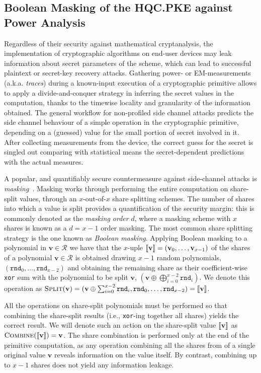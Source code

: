 \subsection{Boolean Masking of the HQC.PKE against Power Analysis}\label{subsec:masking}
Regardless of their security against mathematical cryptanalysis, the 
implementation of cryptographic algorithms on end-user devices may leak 
information about secret parameters of the scheme, which can lead to 
successful plaintext or secret-key recovery attacks. 
Gathering power- or EM-measurements (a.k.a. {\em traces}) during a known-input 
execution of a cryptographic primitive allows to apply a divide-and-conquer 
strategy in inferring the secret values in the computation, thanks to the 
timewise locality and granularity of the information obtained.
The general workflow for non-profiled side channel attacks predicts the side
channel behaviour of a simple operation in the cryptographic primitive, depending
on a (guessed) value for the small portion of secret involved in it.
After collecting measurements from the device, the correct guess for the secret
is singled out comparing with statistical means the secret-dependent predictions
with the actual measures.

A popular, and quantifiably secure countermeasure against side-channel attacks 
is \emph{masking}~\cite{ishai2003private,prouff2013masking}.
Masking works through performing the entire computation on share-split values, 
through an $x$-out-of-$x$ share splitting schemes.
The number of shares into which a value is split provides a quantification
of the security margin: this is commonly denoted as the \emph{masking order} $d$, 
where a masking scheme with $x$ shares is known as a $d=x-1$ order masking.
The most common share splitting strategy is the one known as 
\emph{Boolean masking}.
Applying Boolean masking to a polynomial in $\mathbf{v}\in\mathcal{R}$ we have that the $x$-uple $ \llbracket \mathbf{v} \rrbracket = (\mathbf{v}_0,\ldots,\mathbf{v}_{x-1})$ of the shares of a polynomial $\mathbf{v}\in \mathcal{R}$ is obtained drawing $x-1$ random polynomials, 
$(\mathtt{rnd}_0,\ldots,\mathtt{rnd}_{x-2})$ and obtaining the remaining share 
as their coefficient-wise \texttt{xor} sum with the polynomial to be 
split $\mathbf{v}$, $(\mathbf{v}\oplus \bigoplus_{i=0}^{x-2} 
\mathtt{rnd}_i)$. We denote this operation as 
$\text{\sc Split}(\mathbf{v}) = (\mathbf{v}\oplus \sum_{i=0}^{x-2} \mathtt{rnd}_i,\mathtt{rnd}_0,\ldots,\mathtt{rnd}_{x-2})= \llbracket \mathbf{v} \rrbracket $.

All the operations on share-split polynomials must be performed so that combining
the share-split results (i.e., \texttt{xor}-ing together all shares) yields the correct result. 
We will denote such an action on the share-split value $ \llbracket \mathbf{v} \rrbracket $ as
$\text{\sc Combine}( \llbracket \mathbf{v} \rrbracket )=\mathbf{v}$.
The share combination is performed only at the end of the primitive computation, as any operation combining all the shares from of a single original value $\mathbf{v}$ reveals information on the value itself.
By contrast, combining up to $x-1$ shares does not yield any information 
leakage.

